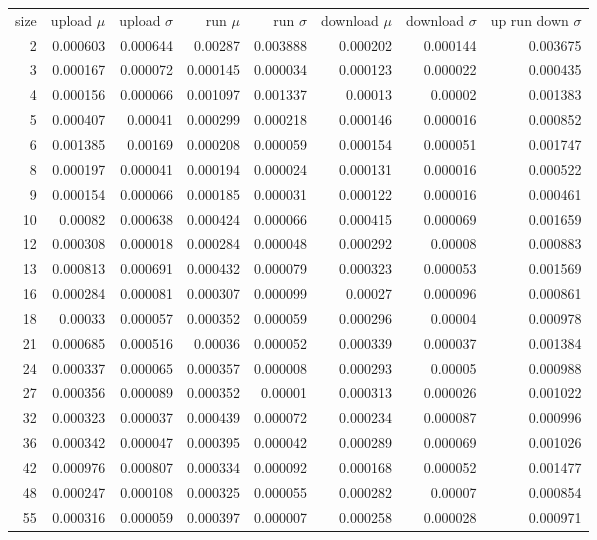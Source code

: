 \begin{longtable}{r r r r r r r r}
size & upload $\mu$  & upload $\sigma$ & run $\mu$ & run $\sigma$ & download $\mu$ & download $\sigma$ & up run down $\sigma$ \\
2 & 0.000603 & 0.000644 & 0.00287 & 0.003888 & 0.000202 & 0.000144 & 0.003675 \\
3 & 0.000167 & 0.000072 & 0.000145 & 0.000034 & 0.000123 & 0.000022 & 0.000435 \\
4 & 0.000156 & 0.000066 & 0.001097 & 0.001337 & 0.00013 & 0.00002 & 0.001383 \\
5 & 0.000407 & 0.00041 & 0.000299 & 0.000218 & 0.000146 & 0.000016 & 0.000852 \\
6 & 0.001385 & 0.00169 & 0.000208 & 0.000059 & 0.000154 & 0.000051 & 0.001747 \\
8 & 0.000197 & 0.000041 & 0.000194 & 0.000024 & 0.000131 & 0.000016 & 0.000522 \\
9 & 0.000154 & 0.000066 & 0.000185 & 0.000031 & 0.000122 & 0.000016 & 0.000461 \\
10 & 0.00082 & 0.000638 & 0.000424 & 0.000066 & 0.000415 & 0.000069 & 0.001659 \\
12 & 0.000308 & 0.000018 & 0.000284 & 0.000048 & 0.000292 & 0.00008 & 0.000883 \\
13 & 0.000813 & 0.000691 & 0.000432 & 0.000079 & 0.000323 & 0.000053 & 0.001569 \\
16 & 0.000284 & 0.000081 & 0.000307 & 0.000099 & 0.00027 & 0.000096 & 0.000861 \\
18 & 0.00033 & 0.000057 & 0.000352 & 0.000059 & 0.000296 & 0.00004 & 0.000978 \\
21 & 0.000685 & 0.000516 & 0.00036 & 0.000052 & 0.000339 & 0.000037 & 0.001384 \\
24 & 0.000337 & 0.000065 & 0.000357 & 0.000008 & 0.000293 & 0.00005 & 0.000988 \\
27 & 0.000356 & 0.000089 & 0.000352 & 0.00001 & 0.000313 & 0.000026 & 0.001022 \\
32 & 0.000323 & 0.000037 & 0.000439 & 0.000072 & 0.000234 & 0.000087 & 0.000996 \\
36 & 0.000342 & 0.000047 & 0.000395 & 0.000042 & 0.000289 & 0.000069 & 0.001026 \\
42 & 0.000976 & 0.000807 & 0.000334 & 0.000092 & 0.000168 & 0.000052 & 0.001477 \\
48 & 0.000247 & 0.000108 & 0.000325 & 0.000055 & 0.000282 & 0.00007 & 0.000854 \\
55 & 0.000316 & 0.000059 & 0.000397 & 0.000007 & 0.000258 & 0.000028 & 0.000971 \\

\end{longtable}
